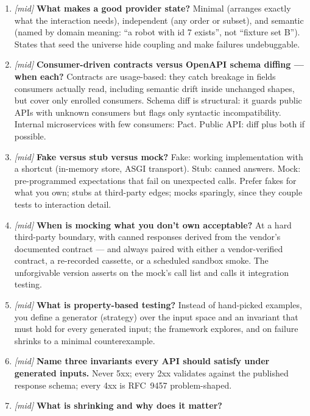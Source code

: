 \begin{enumerate}[label=\textbf{Q\arabic*.}, leftmargin=1.7cm]
        million requests a day, ten thousand users had a bad day while the
        average looked fine.
  \item \emph{[mid]} \textbf{What makes a good provider state?} Minimal
        (arranges exactly what the interaction needs), independent (any
        order or subset), and semantic (named by domain meaning:
        ``a robot with id 7 exists'', not ``fixture set B''). States that
        seed the universe hide coupling and make failures undebuggable.
  \item \emph{[mid]} \textbf{Consumer-driven contracts versus OpenAPI
        schema diffing --- when each?} Contracts are usage-based: they
        catch breakage in fields consumers actually read, including
        semantic drift inside unchanged shapes, but cover only enrolled
        consumers. Schema diff is structural: it guards public APIs with
        unknown consumers but flags only syntactic incompatibility.
        Internal microservices with few consumers: Pact. Public API:
        diff plus both if possible.
  \item \emph{[mid]} \textbf{Fake versus stub versus mock?} Fake: working
        implementation with a shortcut (in-memory store, ASGI transport).
        Stub: canned answers. Mock: pre-programmed expectations that fail
        on unexpected calls. Prefer fakes for what you own; stubs at
        third-party edges; mocks sparingly, since they couple tests to
        interaction detail.
  \item \emph{[mid]} \textbf{When is mocking what you don't own
        acceptable?} At a hard third-party boundary, with canned responses
        derived from the vendor's documented contract --- and always paired
        with either a vendor-verified contract, a re-recorded cassette, or
        a scheduled sandbox smoke. The unforgivable version asserts on the
        mock's call list and calls it integration testing.
  \item \emph{[mid]} \textbf{What is property-based testing?} Instead of
        hand-picked examples, you define a generator (strategy) over the
        input space and an invariant that must hold for every generated
        input; the framework explores, and on failure shrinks to a minimal
        counterexample.
  \item \emph{[mid]} \textbf{Name three invariants every API should
        satisfy under generated inputs.} Never 5xx; every 2xx validates
        against the published response schema; every 4xx is RFC~9457
        problem-shaped.
  \item \emph{[mid]} \textbf{What is shrinking and why does it matter?}

\end{enumerate}

